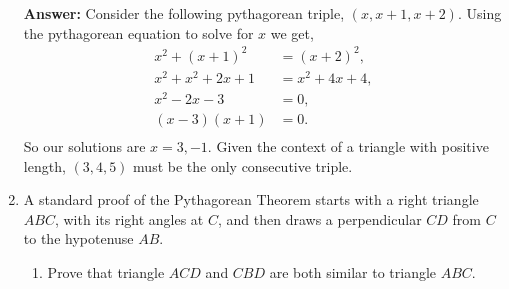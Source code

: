 \documentclass[12pt]{article}
\theoremstyle{homework}
\begin{document}
\begin{enumerate}
\textbf{Answer:} Consider the following pythagorean triple, $(x, x+1, x+2)$. Using the pythagorean equation to solve for $x$ we get,
\begin{align*}
  x^2 + (x+1)^2 &= (x+2)^2,\\
  x^2 + x^2 + 2x +1 &= x^2 + 4x + 4,\\
  x^2  -2x - 3 &=0,\\
  (x-3)(x+1) &=0.\\
\end{align*}
So our solutions are $x = 3, -1$. Given the context of a triangle with positive length, $(3,4,5)$ must be the only consecutive triple.

\vspace{.5in}




\setcounter{enumi}{14}
\item A standard proof of the Pythagorean Theorem starts with a right triangle $ABC$, with its right angles at $C$,
and then draws a perpendicular $CD$ from $C$ to the hypotenuse $AB$. \\
\begin{enumerate}
  \item Prove that triangle $ACD$ and $CBD$ are both similar to triangle $ABC$.\\


\end{enumerate}
\end{enumerate}
\end{document}

